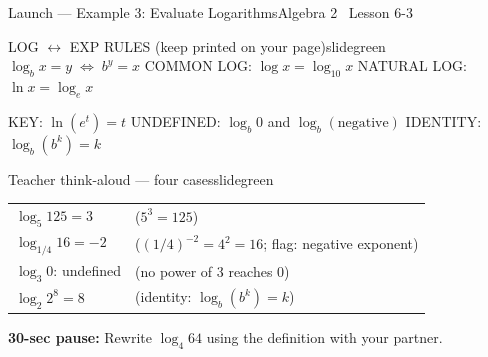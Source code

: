 \documentclass[aspectratio=169, 11pt]{beamer}
\begin{document}
\begin{frame}{Launch --- Example 3: Evaluate Logarithms}{Algebra 2 \textperiodcentered\ Lesson 6-3}
\vspace{0.15cm}
\begin{projcard}{LOG \(\leftrightarrow\) EXP RULES (keep printed on your page)}{slidegreen}
\(\log_b x = y \;\Leftrightarrow\; b^y = x\) \hfill
COMMON LOG: \(\log x = \log_{10} x\) \hfill
NATURAL LOG: \(\ln x = \log_e x\)

\smallskip
KEY: \(\ln(e^t) = t\) \hspace{1em}
UNDEFINED: \(\log_b 0\) and \(\log_b(\text{negative})\) \hspace{1em}
IDENTITY: \(\log_b(b^k) = k\)
\end{projcard}

\vspace{0.1cm}
\begin{projcard}{Teacher think-aloud --- four cases}{slidegreen}
\small
\begin{tabular}{ll}
\(\log_5 125 = 3\) & \small(\(5^3 = 125\)) \\[2pt]
\(\log_{1/4} 16 = -2\) & \small(\((1/4)^{-2} = 4^2 = 16\); flag: negative exponent) \\[2pt]
\(\log_3 0\): undefined & \small(no power of 3 reaches 0) \\[2pt]
\(\log_2 2^8 = 8\) & \small(identity: \(\log_b(b^k)=k\)) \\
\end{tabular}

\smallskip
\textcolor{slideaccent}{\textbf{30-sec pause:} Rewrite \(\log_4 64\) using the definition with your partner.}
\end{projcard}
\end{frame}
\end{document}
